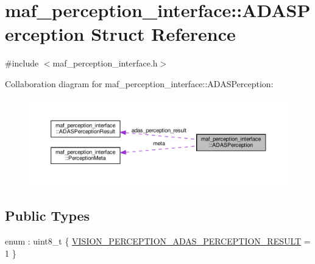 \hypertarget{structmaf__perception__interface_1_1ADASPerception}{}\section{maf\+\_\+perception\+\_\+interface\+:\+:A\+D\+A\+S\+Perception Struct Reference}
\label{structmaf__perception__interface_1_1ADASPerception}


{\ttfamily \#include $<$maf\+\_\+perception\+\_\+interface.\+h$>$}



Collaboration diagram for maf\+\_\+perception\+\_\+interface\+:\+:A\+D\+A\+S\+Perception\+:\nopagebreak
\begin{figure}[H]
\begin{center}
\leavevmode
\includegraphics[width=350pt]{structmaf__perception__interface_1_1ADASPerception__coll__graph}
\end{center}
\end{figure}
\subsection*{Public Types}
\begin{DoxyCompactItemize}
\item 
enum \+: uint8\+\_\+t \{ \hyperlink{structmaf__perception__interface_1_1ADASPerception_a07a7cdb2910a66db83f342c5964657a3ab714e79f3e4abe9c24cd98d2849a3771}{V\+I\+S\+I\+O\+N\+\_\+\+P\+E\+R\+C\+E\+P\+T\+I\+O\+N\+\_\+\+A\+D\+A\+S\+\_\+\+P\+E\+R\+C\+E\+P\+T\+I\+O\+N\+\_\+\+R\+E\+S\+U\+LT} = 1
 \}
\end{DoxyCompactItemize}
